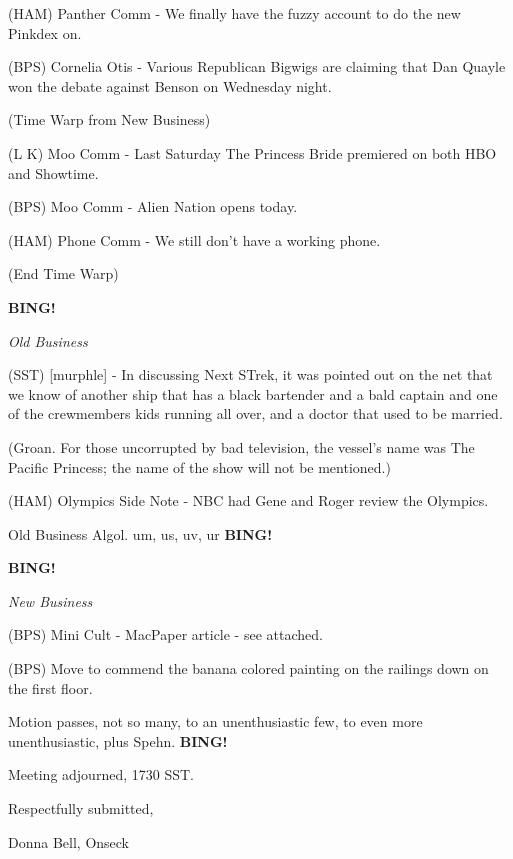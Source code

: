 \documentclass[12pt]{article}
\newcommand{\bing}{{\bf BING!} }
\newcommand{\goto}[1]{\bing \vskip 12pt \centerline{{\em{#1}}}}
\begin{document}
(HAM) Panther Comm - We finally have the fuzzy account to do the new Pinkdex on.

(BPS) Cornelia Otis - Various Republican Bigwigs are claiming that Dan Quayle won the debate against Benson on Wednesday night.

(Time Warp from New Business)

(L K) Moo Comm - Last Saturday The Princess Bride premiered on both HBO and Showtime.

(BPS) Moo Comm - Alien Nation opens today.

(HAM) Phone Comm - We still don't have a working phone.

(End Time Warp)

\goto{Old Business}

(SST) [murphle] - In discussing Next STrek, it was pointed out on the net that we know of another ship that has a black bartender and a bald captain and one of the crewmembers kids running all over, and a doctor that used to be married.

(Groan. For those uncorrupted by bad television, the vessel's name was The Pacific Princess; the name of the show will not be mentioned.)

(HAM) Olympics Side Note - NBC had Gene and Roger review the Olympics.

Old Business Algol. um, us, uv, ur \bing

\goto{New Business}

(BPS) Mini Cult - MacPaper article - see attached.

(BPS) Move to commend the banana colored painting on the railings down on the first floor.

Motion passes, not so many, to an unenthusiastic few, to even more unenthusiastic, plus Spehn. \bing

\vspace{12pt}

\noindent
Meeting adjourned, 1730 SST.

\vspace{18pt}

\centerline{Respectfully submitted,}
\centerline{Donna Bell, Onseck}
\end{document}

